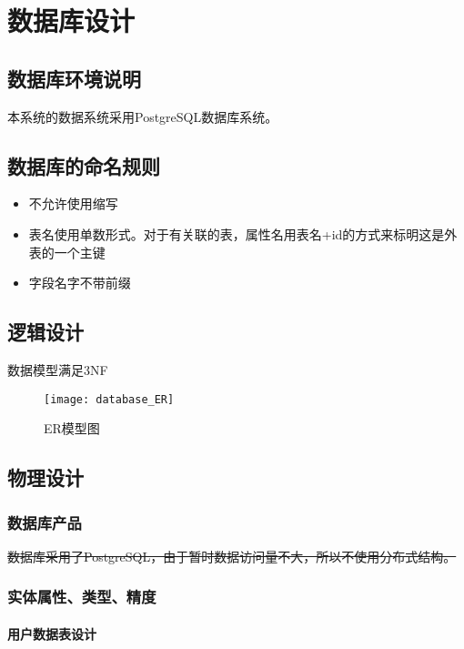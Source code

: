 \chapter{数据库设计}
\section{数据库环境说明}
本系统的数据系统采用PostgreSQL数据库系统。


\section{数据库的命名规则}
\begin{itemize}
	\item 不允许使用缩写
	\item 表名使用单数形式。对于有关联的表，属性名用表名+id的方式来标明这是外表的一个主键
	\item 字段名字不带前缀
\end{itemize}

\section{逻辑设计}

数据模型满足3NF\\
\newpage

\begin{figure}[ht]
	\centering
	\texttt{[image: database\_ER]}
	\caption{ER模型图}\label{fig:ER}
\end{figure}

\section{物理设计}

\subsection{数据库产品}

\sout{数据库采用了PostgreSQL，由于暂时数据访问量不大，所以不使用分布式结构。}

\subsection{实体属性、类型、精度}

\subsubsection{用户数据表设计}

